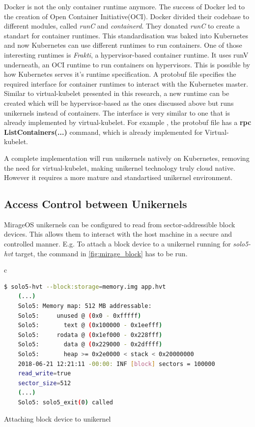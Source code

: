 Docker is not the only container runtime anymore. The success of Docker led to the creation of Open Container Initiative(OCI). Docker divided their codebase to different modules, called \textit{runC} and \textit{containerd}. They donated \textit{runC} to create a standart for container runtimes. This standardisation was baked into Kubernetes and now Kubernetes can use different runtimes to run containers. One of those interesting runtimes is \textit{Frakti}, a hypervisor-based container runtime. It uses runV underneath, an OCI runtime to run containers on hypervisors. This is possible by how Kubernetes serves it's runtime specification. A protobuf file \cite{protobuf} specifies the required interface for container runtimes to interact with the Kubernetes master. Similar to virtual-kubelet presented in this research, a new runtime can be created which will be hypervisor-based as the ones discussed above but runs unikernels instead of containers. The interface is very similar to one that is already implemented by virtual-kubelet. For example , the protobuf file has a \textbf{rpc ListContainers(...)} command, which is already implemented for Virtual-kubelet.

A complete implementation will run unikernels natively on Kubernetes, removing the need for virtual-kubelet, making unikernel technology truly cloud native. However it requires a more mature and standartised unikernel environment.

\subsection{Access Control between Unikernels}

MirageOS unikernels can be configured to read from sector-addressible block devices. This allows them to interact with the host machine in a secure and controlled manner. E.g. To attach a block device to a unikernel running for \textit{solo5-hvt} target,  the command in \ref{fig:mirage_block} has to be run.

\begin{code}[htpb]
  \centering
  \begin{tabular}{c}
  \begin{lstlisting}[language=bash]
    $ solo5-hvt --block:storage=memory.img app.hvt
    (...)
    Solo5: Memory map: 512 MB addressable:
    Solo5:     unused @ (0x0 - 0xfffff)
    Solo5:       text @ (0x100000 - 0x1eefff)
    Solo5:     rodata @ (0x1ef000 - 0x228fff)
    Solo5:       data @ (0x229000 - 0x2dffff)
    Solo5:       heap >= 0x2e0000 < stack < 0x20000000
    2018-06-21 12:21:11 -00:00: INF [block] sectors = 100000
    read_write=true
    sector_size=512
    (...)
    Solo5: solo5_exit(0) called
\end{lstlisting}
\end{tabular}
\caption{Attaching block device to unikernel}\label{fig:mirage_block}
\end{code}

